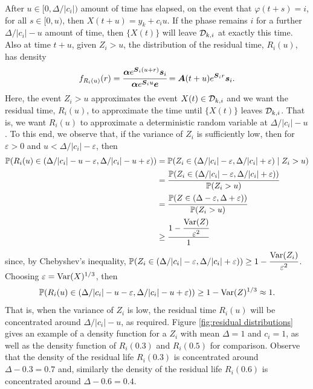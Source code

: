 After \(u\in[0,\Delta/|c_i|)\) amount of time has elapsed, on the event that \(\varphi(t+s)=i\), for all \(s\in[0,u)\), then \(X(t+u) = y_k + c_i u\). If the phase remains \(i\) for a further \(\Delta/|c_i|-u\) amount of time, then \(\{X(t)\}\) will leave \(\mathcal{D}_{k,i}\) at exactly this time. Also at time \(t+u\), given \(Z_i>u\), the distribution of the residual time, \(R_i(u)\), has density 
\[f_{R_i(u)}(r) = \cfrac{\boldsymbol\alpha e^{\boldsymbol S_i(u+ r) } \boldsymbol s_i}{\boldsymbol\alpha e^{\boldsymbol S_iu } \boldsymbol e} = \boldsymbol A(t+u) e^{\boldsymbol S_i r}  \boldsymbol s_i.\]
Here, the event \(Z_i>u\) approximates the event \(X(t)\in\mathcal{D}_{k,i}\) and we want the residual time, \(R_i(u)\), to approximate the time until \(\{X(t)\}\) leaves \(\mathcal{D}_{k,i}\). That is, we want \(R_i(u)\) to approximate a deterministic random variable at \(\Delta/|c_i| - u\). To this end, we observe that, if the variance of \(Z_i\) is sufficiently low, then for \(\varepsilon>0\) and \(u<\Delta/|c_i|-\varepsilon\), then
\begin{align}
	\mathbb P(R_i(u) \in (\Delta/|c_i|-u-\varepsilon, \Delta/|c_i|-u + \varepsilon)) 
	&= \mathbb P(Z_i\in (\Delta/|c_i|-\varepsilon, \Delta/|c_i| + \varepsilon)\mid Z_i > u) 
	\\&= \cfrac{\mathbb P(Z_i\in (\Delta/|c_i|-\varepsilon, \Delta/|c_i| + \varepsilon))}{\mathbb P(Z_i > u)} 
	\\&= \cfrac{\mathbb P(Z\in (\Delta-\varepsilon, \Delta + \varepsilon))}{\mathbb P(Z_i > u)} 
	\\&\geq \cfrac{1-\cfrac{\mathrm{Var}(Z)}{\varepsilon^2}}{1} 
\end{align}
since, by Chebyshev's inequality, \(\mathbb P(Z_i\in (\Delta/|c_i|-\varepsilon, \Delta/|c_i| + \varepsilon)) \geq 1- \cfrac{\mathrm{Var}(Z_i)}{\varepsilon^2}\). Choosing \(\varepsilon = \mathrm{Var}(X)^{1/3}\), then 
\[\mathbb P(R_i(u) \in (\Delta/|c_i|-u-\varepsilon, \Delta/|c_i|-u + \varepsilon))\geq 1-\mathrm{Var}(Z)^{1/3} \approx 1. \]
That is, when the variance of \(Z_i\) is low, the residual time \(R_i(u)\) will be concentrated around \(\Delta/|c_i| - u\), as required. Figure \ref{fig:residual distributions} gives an example of a density function for a \(Z_i\) with mean \(\Delta=1\) and \(c_i=1\), as well as the density function of \(R_i(0.3)\) and \(R_i(0.5)\) for comparison. Observe that the density of the residual life \(R_i(0.3)\) is concentrated around \(\Delta-0.3 = 0.7\) and, similarly the density of the residual life \(R_i(0.6)\) is concentrated around \(\Delta-0.6 = 0.4\).


